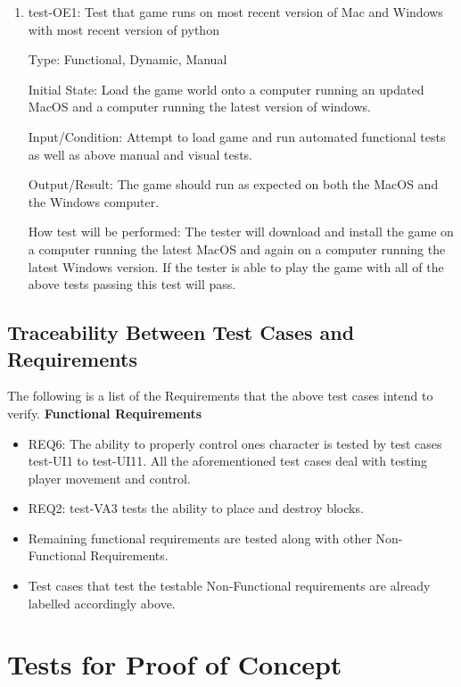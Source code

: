 \documentclass[12pt, titlepage]{article}
\begin{document}
\begin{enumerate}

\item{test-OE1: Test that game runs on most recent version of Mac and Windows with most recent version of python\\}

Type: Functional, Dynamic, Manual
					
Initial State: Load the game world onto a computer running an updated MacOS and a computer running the latest version of windows.
					
Input/Condition: Attempt to load game and run automated functional tests as well as above manual and visual tests.
					
Output/Result: The game should run as expected on both the MacOS and the Windows computer.
					
How test will be performed: The tester will download and install the game on a computer running the latest MacOS and again on a computer running the latest Windows version. If the tester is able to play the game with all of the above tests passing this test will pass.

\end{enumerate}




\subsection{Traceability Between Test Cases and Requirements}
The following is a list of the Requirements that the above test cases intend to verify.
\textbf{Functional Requirements}
\begin{itemize}
    \item REQ6: The ability to properly control ones character is tested by test cases test-UI1 to test-UI11. All the aforementioned test cases deal with testing player movement and control.
    \item REQ2: test-VA3 tests the ability to place and destroy blocks.
    \item Remaining functional requirements are tested along with other Non-Functional Requirements.
    \item Test cases that test the testable Non-Functional requirements are already labelled accordingly above.
\end{itemize}

\section{Tests for Proof of Concept}
\end{document}
